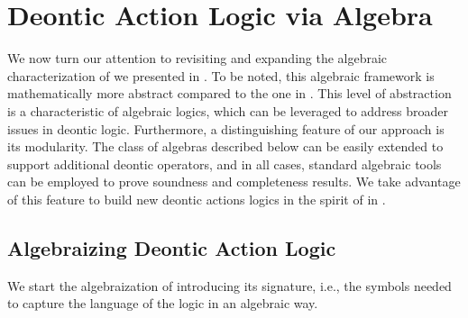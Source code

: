 \section{Deontic Action Logic via Algebra}\label{sec:algebraic-char}


We now turn our attention to revisiting and expanding the algebraic characterization of \DAL we presented in \cite{CCFA:2021}. To be noted, this algebraic framework is mathematically more abstract compared to the one in \cite{Segerberg1982}. This level of abstraction is a characteristic of algebraic logics, which can be leveraged to address broader issues in deontic logic. Furthermore, a distinguishing feature of our approach is its modularity. The class of algebras described below can be easily extended to support additional deontic operators, and in all cases, standard algebraic tools can be employed to prove soundness and completeness results.
We take advantage of this feature to build new deontic actions logics in the spirit of \DAL in .




\subsection{Algebraizing Deontic Action Logic}
We start the algebraization of  \DAL introducing its signature, i.e., the symbols needed to capture the language of the logic in an algebraic way.



